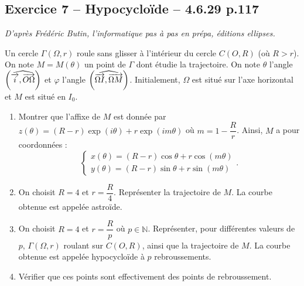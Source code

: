\documentclass[10pt,fleqn]{article} %
\begin{document}
\begin{multicols}{2}
\subsection*{Exercice 7 -- Hypocycloïde -- 4.6.29 p.117}
\begin{flushright}
\textit{D'après Frédéric Butin, l'informatique pas à pas en prépa, éditions ellipses.}
\end{flushright}

Un cercle $ \Gamma\left(\Omega,r\right)$ roule sans glisser à l'intérieur du cercle $C\left(O,R\right)$ (où $R>r$). On note $M=M(\theta)$ un point de $\Gamma$ dont étudie la trajectoire. On note $\theta$ l'angle $\left( \widehat{\overrightarrow{i},\overrightarrow{O\Omega}}\right)$ et $\varphi$ l'angle $\left( \widehat{\overrightarrow{\Omega I},\overrightarrow{\Omega M}}\right)$. Initialement, $\Omega$ est situé sur l'axe horizontal et $M$ est situé en $I_0$.

\begin{center}
\end{center}

\begin{enumerate}
\item Montrer que l'affixe de $M$ est donnée par $z(\theta)=\left(R-r\right) \exp\left(i\theta \right) + r \exp\left(i  m \theta \right)$ où $m=1-\dfrac{R}{r}$. Ainsi, $M$ a pour coordonnées :
$$
\left\{
\begin{array}{l}
x(\theta)= \left(R-r\right) \cos \theta +r \cos \left(m \theta \right) \\
y(\theta)= \left(R-r\right) \sin \theta +r \sin \left(m \theta \right) 
\end{array}
\right. .
$$
\item On choisit $R=4$ et $r=\dfrac{R}{4}$. Représenter la trajectoire de $M$. La courbe obtenue est appelée astroïde. 
\item On choisit $R=4$ et $r=\dfrac{R}{p}$ où $p\in \mathbb{N}$. Représenter, pour différentes valeurs de $p$, $\Gamma\left(\Omega,r\right)$ roulant sur $C\left(O,R\right)$, ainsi que la trajectoire de $M$. La courbe obtenue est appelée hypocycloïde à $p$ rebroussements. 
\item Vérifier que ces points sont effectivement des points de rebroussement.
\end{enumerate}



\end{multicols}
\end{document}
